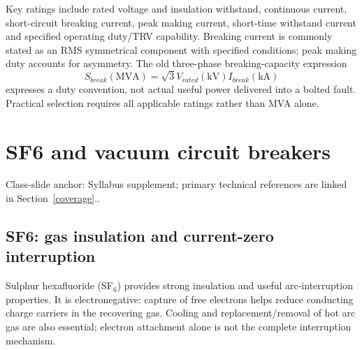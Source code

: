 \documentclass[11pt,a4paper]{article}
\newcommand{\slides}[1]{{\small\color{muted}\textsf{Class-slide anchor: #1.}}\par}
\newcommand{\chapterstart}[2]{\clearpage\section{#1}\label{#2}}
\begin{document}
Key ratings include rated voltage and insulation withstand, continuous current, short-circuit breaking current, peak making current, short-time withstand current and specified operating duty/TRV capability. Breaking current is commonly stated as an RMS symmetrical component with specified conditions; peak making duty accounts for asymmetry. The old three-phase breaking-capacity expression
\[
 S_{break}(\mathrm{MVA})=\sqrt3V_{rated}(\mathrm{kV})I_{break}(\mathrm{kA})
\]
expresses a duty convention, not actual useful power delivered into a bolted fault. Practical selection requires all applicable ratings rather than MVA alone.

\chapterstart{SF6 and vacuum circuit breakers}{sfvac}
\slides{Syllabus supplement; primary technical references are linked in Section~\ref{coverage}.}
\subsection{SF6: gas insulation and current-zero interruption}
Sulphur hexafluoride (SF$_6$) provides strong insulation and useful arc-interruption properties. It is electronegative: capture of free electrons helps reduce conducting charge carriers in the recovering gas. Cooling and replacement/removal of hot arc gas are also essential; electron attachment alone is not the complete interruption mechanism.
\end{document}

